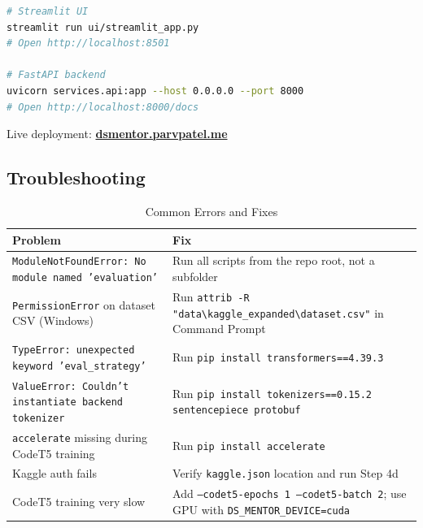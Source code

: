 \documentclass[12pt,a4paper]{article}
\begin{document}
\begin{lstlisting}[language=bash]
# Streamlit UI
streamlit run ui/streamlit_app.py
# Open http://localhost:8501

# FastAPI backend
uvicorn services.api:app --host 0.0.0.0 --port 8000
# Open http://localhost:8000/docs
\end{lstlisting}

Live deployment: \href{https://dsmentor.parvpatel.me}{\textbf{dsmentor.parvpatel.me}}

\subsection{Troubleshooting}

\begin{table}[h!]
\centering
\caption{Common Errors and Fixes}
\small
\begin{tabularx}{\textwidth}{lX}
\toprule
Problem & Fix \\
\midrule
\texttt{ModuleNotFoundError: No module named 'evaluation'} & Run all scripts from the repo root, not a subfolder \\
\texttt{PermissionError} on dataset CSV (Windows) & Run \texttt{attrib -R "data\textbackslash kaggle\_expanded\textbackslash dataset.csv"} in Command Prompt \\
\texttt{TypeError: unexpected keyword 'eval\_strategy'} & Run \texttt{pip install transformers==4.39.3} \\
\texttt{ValueError: Couldn't instantiate backend tokenizer} & Run \texttt{pip install tokenizers==0.15.2 sentencepiece protobuf} \\
\texttt{accelerate} missing during CodeT5 training & Run \texttt{pip install accelerate} \\
Kaggle auth fails & Verify \texttt{kaggle.json} location and run Step 4d \\
CodeT5 training very slow & Add \texttt{--codet5-epochs 1 --codet5-batch 2}; use GPU with \texttt{DS\_MENTOR\_DEVICE=cuda} \\
\bottomrule
\end{tabularx}
\end{table}
\end{document}
